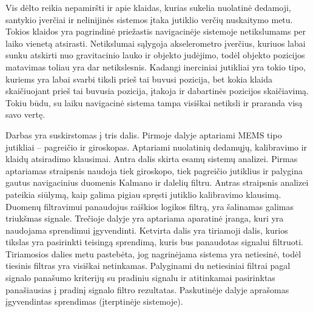 Vis dėlto reikia nepamiršti ir apie klaidas, kurias sukelia nuolatinė dedamoji, santykio įverčiai ir nelinijinės sistemos įtaka jutiklio verčių nuskaitymo metu.
Tokios klaidos yra pagrindinė priežastis navigacinėje sistemoje netikslumams per laiko vienetą atsirasti. 
Netikslumai sąlygoja akselerometro įverčius, kuriuos labai sunku atskirti nuo gravitacinio lauko ir objekto judėjimo, todėl objekto pozicijos matavimas toliau yra dar netikslesnis. 
Kadangi inerciniai jutikliai yra tokio tipo, kuriems yra labai svarbi tiksli prieš tai buvusi pozicija, bet kokia klaida skaičiuojant prieš tai buvusia pozicija, įtakoja ir dabartinės pozicijos skaičiavimą. 
Tokiu būdu, su laiku navigacinė sistema tampa visiškai netiksli ir praranda visą savo vertę.

Darbas yra suskirstomas į tris dalis. 
Pirmoje dalyje aptariami MEMS tipo jutikliai -- pagreičio ir giroskopas. 
Aptariami nuolatinių dedamųjų, kalibravimo ir klaidų atsiradimo klausimai. 
Antra dalis skirta esamų sistemų analizei. 
Pirmas aptariamas straipsnis \cite{willemsenconcept} naudoja tiek giroskopo, tiek pagreičio jutiklius ir palygina gautus navigacinius duomenis Kalmano ir dalelių filtru. 
Antras straipsnis \cite{yoo2011fuzzy} analizei pateikia siūlymą, kaip galima pigiau spręsti jutiklio kalibravimo klausimą.
Duomenų filtravimui panaudojus raiškios logikos filtrą, yra šalinamas galimas triukšmas signale.
Trečioje dalyje yra aptariama aparatinė įranga, kuri yra naudojama sprendimui įgyvendinti.
Ketvirta dalis yra tiriamoji dalis, kurios tikslas yra pasirinkti teisingą sprendimą, kuris bus panaudotas signalui filtruoti.
Tiriamosios dalies metu pastebėta, jog nagrinėjama sistema yra netiesinė, todėl tiesinis filtras yra visiškai netinkamas.
Palyginami du netiesiniai filtrai pagal signalo panašumo kriterijų su pradiniu signalu ir atitinkamai pasirinktas panašiausias į pradinį signalo filtro rezultatas.
Paskutinėje dalyje aprašomas įgyvendintas sprendimas (įterptinėje sistemoje).